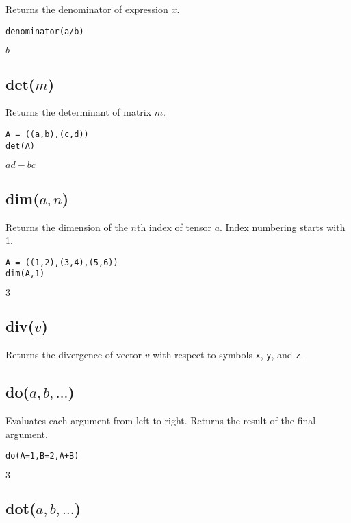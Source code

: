 \documentclass[12pt]{article}
\begin{document}
Returns the denominator of expression $x$.

{\color{blue}
\begin{verbatim}
denominator(a/b)
\end{verbatim}
}

\noindent
$b$

\subsection*{det($m$)}

Returns the determinant of matrix $m$.

{\color{blue}
\begin{verbatim}
A = ((a,b),(c,d))
det(A)
\end{verbatim}
}

\noindent
$a d - b c$

\subsection*{dim($a,n$)}

Returns the dimension of the $n$th index of tensor $a$.
Index numbering starts with 1.

{\color{blue}
\begin{verbatim}
A = ((1,2),(3,4),(5,6))
dim(A,1)
\end{verbatim}
}

\noindent
$3$

\subsection*{div($v$)}

Returns the divergence of vector $v$ with respect to symbols \verb$x$, \verb$y$, and \verb$z$.

\subsection*{do($a,b,\ldots$)}

Evaluates each argument from left to right.
Returns the result of the final argument.

{\color{blue}
\begin{verbatim}
do(A=1,B=2,A+B)
\end{verbatim}
}

\noindent
$3$

\subsection*{dot($a,b,\ldots$)}
\end{document}
